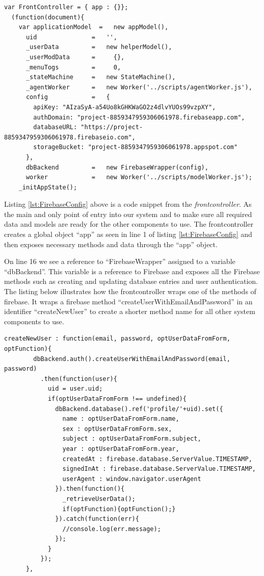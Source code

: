 \begin{lstlisting}[caption={Initiating frontcontroller and creating an instance of Firebase}, label={lst:FirebaseConfig}]
var FrontController = { app : {}};
  (function(document){
    var applicationModel  =   new appModel(),
      uid               =   '',
      _userData         =   new helperModel(),
      _userModData      =     {},
      _menuTogs         =     0,
      _stateMachine     =   new StateMachine(),
      _agentWorker      =   new Worker('../scripts/agentWorker.js'),
      config            =   {
        apiKey: "AIzaSyA-a54Uo8kGHKWaGO2z4dlvYUOs99vzpXY",
        authDomain: "project-8859347959306061978.firebaseapp.com",
        databaseURL: "https://project-8859347959306061978.firebaseio.com",
        storageBucket: "project-8859347959306061978.appspot.com"
      },
      dbBackend         =   new FirebaseWrapper(config),
      worker            =   new Worker('../scripts/modelWorker.js');
    _initAppState();
\end{lstlisting}
Listing \ref{lst:FirebaseConfig} above is a code snippet from the \emph{frontcontroller}. As the main and only point of entry into our system and to make sure all required data and models are ready for the other components to use. The frontcontroller creates a global object ``app'' as seen in line 1 of listing \ref{lst:FirebaseConfig} and then exposes necessary methods and data through the ``app'' object.

On line 16 we see a reference to ``FirebaseWrapper'' assigned to a variable ``dbBackend''. This variable is a reference to Firebase and exposes all the Firebase methods such as creating and updating database entries and user authentication. The listing below illustrates how the frontcontroller wraps one of the methods of firebase. It wraps a firebase method ``createUserWithEmailAndPassword'' in an identifier ``createNewUser'' to create a shorter method name for all other system components to use.

\begin{lstlisting}[caption={creating a new user}, label={lst:CreateUSer}]
    createNewUser : function(email, password, optUserDataFromForm, optFunction){
        dbBackend.auth().createUserWithEmailAndPassword(email, password)
          .then(function(user){
            uid = user.uid;
            if(optUserDataFromForm !== undefined){
              dbBackend.database().ref('profile/'+uid).set({
                name : optUserDataFromForm.name,
                sex : optUserDataFromForm.sex,
                subject : optUserDataFromForm.subject,
                year : optUserDataFromForm.year,
                createdAt : firebase.database.ServerValue.TIMESTAMP,
                signedInAt : firebase.database.ServerValue.TIMESTAMP,
                userAgent : window.navigator.userAgent
              }).then(function(){
                _retrieveUserData();
                if(optFunction){optFunction();}
              }).catch(function(err){
                //console.log(err.message);
              });
            }
          });
      },
\end{lstlisting}


